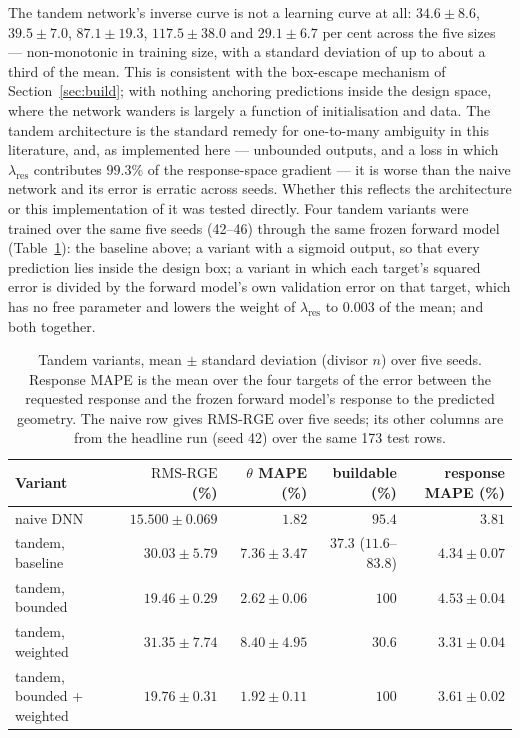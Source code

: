 \documentclass[11pt]{article}
\newcommand{\lres}{\lambda_{\mathrm{res}}}
\newcommand{\rge}{\mathrm{RMS\text{-}RGE}}
\begin{document}
The tandem network's inverse curve is not a learning curve at all:
$34.6 \pm 8.6$, $39.5 \pm 7.0$, $87.1 \pm 19.3$, $117.5 \pm 38.0$ and
$29.1 \pm 6.7$ per cent across the five sizes --- non-monotonic in training
size, with a standard deviation of up to about a third of the mean. This is
consistent with the box-escape mechanism of Section~\ref{sec:build}; with
nothing anchoring predictions inside the design space, where the network
wanders is largely a function of initialisation and data. The tandem
architecture is the standard remedy for one-to-many ambiguity in this
literature, and, as implemented here --- unbounded outputs, and a loss in which $\lres$ contributes $99.3\%$ of the response-space gradient --- it is worse than the naive network and its error is erratic across seeds. Whether this reflects the architecture or this implementation of it was tested directly. Four tandem variants were trained over the same five seeds (42--46) through the same frozen forward model (Table~\ref{tab:tandemfix}): the baseline above; a variant with a sigmoid output, so that every prediction lies inside the design box; a variant in which each target's squared error is divided by the forward model's own validation error on that target, which has no free parameter and lowers the weight of $\lres$ to $0.003$ of the mean; and both together.

\begin{table}[!tbp]
\centering
\caption{Tandem variants, mean $\pm$ standard deviation (divisor $n$) over five seeds. Response MAPE is the mean over the four targets of the error between the requested response and the frozen forward model's response to the predicted geometry. The naive row gives $\rge$ over five seeds; its other columns are from the headline run (seed 42) over the same 173 test rows.}
\label{tab:tandemfix}
\small
\begin{tabular}{@{}lrrrr@{}}
\toprule
Variant & $\rge$ (\%) & $\theta$ MAPE (\%) & buildable (\%) & response MAPE (\%) \\
\midrule
naive DNN                  & $15.500 \pm 0.069$ & $1.82$ & $95.4$ & $3.81$ \\
\midrule
tandem, baseline           & $30.03 \pm 5.79$ & $7.36 \pm 3.47$ & $37.3$ ($11.6$--$83.8$) & $4.34 \pm 0.07$ \\
tandem, bounded            & $19.46 \pm 0.29$ & $2.62 \pm 0.06$ & $100$ & $4.53 \pm 0.04$ \\
tandem, weighted           & $31.35 \pm 7.74$ & $8.40 \pm 4.95$ & $30.6$ & $3.31 \pm 0.04$ \\
tandem, bounded + weighted & $19.76 \pm 0.31$ & $1.92 \pm 0.11$ & $100$ & $3.61 \pm 0.02$ \\
\bottomrule
\end{tabular}
\end{table}
\end{document}
